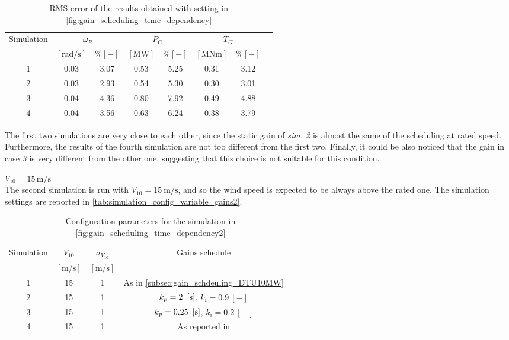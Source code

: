 \begin{table}[htb]
  \caption{RMS error of the results obtained with setting in \autoref{fig:gain_scheduling_time_dependency}}
  \centering
  \begin{tabular}{cccccccc}
    \toprule
      Simulation & \multicolumn{2}{c}{$\omega_R$} & \multicolumn{2}{c}{$P_G$} & \multicolumn{2}{c}{$T_G$} \\ 
       & $\left[\si{\radian\per\second}\right]$ & $ \% \left[-\right]$ & $\left[\si{\mega\watt}\right]$ & $ \% \left[-\right]$ & $\left[\si{\mega\newton\meter} \right]$ & $ \% \left[-\right]$ \\ \midrule       
       1 &  0.03 &  3.07 &  0.53  &  5.25  &  0.31  &  3.12 \\
       2 &  0.03 &  2.93 &  0.54  &  5.30  &  0.30  &  3.01 \\
       3 &  0.04 &  4.36 &  0.80  &  7.92  &  0.49  &  4.88 \\
       4 &  0.04 &  3.56 &  0.63  &  6.24  &  0.38  &  3.79 \\
     \bottomrule
  \end{tabular}
  \label{tab:res_variable_gains}
\end{table}

The first two simulations are very close to each other, since the static gain of \textit{sim. 2} is almost the same of the scheduling at rated speed. Furthermore, the results of the fourth simulation are not too different from the first two. Finally, it could be also noticed that the gain in case \textit{3} is very different from the other one, suggesting that this choice is not suitable for this condition. 

\textbf{$V_{10}=15 \, \si{\meter\per\second}$}\\
The second simulation is run with $V_{10}=15 \ \si{\meter\per\second}$, and so the wind speed is expected to be always above the rated one. The simulation settings are reported in \autoref{tab:simulation_config_variable_gains2}.
\begin{table}[htb]
  \caption{Configuration parameters for the simulation in \autoref{fig:gain_scheduling_time_dependency2}}
  \centering
  \begin{tabular}{ccccc}
  \toprule
    Simulation & $V_{10}$  & $\sigma_{V_{10}}$ & Gains schedule \\ 
     & $\left[\si{\meter\per\second}\right]$ & $\left[\si{\meter\per\second}\right]$ & \\ \midrule       
     1 & 15 & 1 & As in \autoref{subsec:gain_schdeuling_DTU10MW}  \\
     2 & 15 & 1 & $k_p = 2 \ \mesunt{\second}$, $k_i=0.9 \ [-]$ \\
     3 & 15 & 1 & $k_p = 0.25 \ \mesunt{\second}$, $k_i=0.2 \ [-]$  \\
     4 & 15 & 1 & As reported in \cite{Olimpo_Anaya‐Lara}  \\
     \bottomrule
  \end{tabular}
  \label{tab:simulation_config_variable_gains2}
\end{table}

